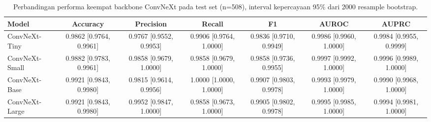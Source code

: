 \begin{table}[htbp]
\centering
\caption{Perbandingan performa keempat backbone ConvNeXt pada test set (n=508), interval kepercayaan 95\% dari 2000 resample bootstrap.}
\label{tab:model-comparison}
\begin{tabular}{lcccccc}
\toprule
Model & Accuracy & Precision & Recall & F1 & AUROC & AUPRC \\
\midrule
ConvNeXt-Tiny & 0.9862 [0.9764, 0.9961] & 0.9767 [0.9552, 0.9953] & 0.9906 [0.9764, 1.0000] & 0.9836 [0.9710, 0.9949] & 0.9986 [0.9960, 1.0000] & 0.9984 [0.9955, 0.9999] \\
ConvNeXt-Small & 0.9882 [0.9783, 0.9961] & 0.9858 [0.9679, 1.0000] & 0.9858 [0.9679, 1.0000] & 0.9858 [0.9736, 0.9955] & 0.9997 [0.9992, 1.0000] & 0.9996 [0.9989, 1.0000] \\
ConvNeXt-Base & 0.9921 [0.9843, 0.9980] & 0.9815 [0.9614, 0.9956] & 1.0000 [1.0000, 1.0000] & 0.9907 [0.9803, 0.9978] & 0.9993 [0.9979, 1.0000] & 0.9990 [0.9968, 1.0000] \\
ConvNeXt-Large & 0.9921 [0.9843, 0.9980] & 0.9952 [0.9847, 1.0000] & 0.9858 [0.9673, 1.0000] & 0.9905 [0.9802, 0.9978] & 0.9995 [0.9985, 1.0000] & 0.9994 [0.9981, 1.0000] \\
\bottomrule
\end{tabular}
\end{table}
